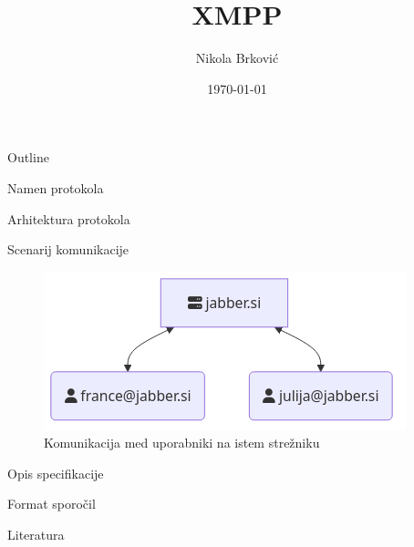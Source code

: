 \documentclass[presentation]{beamer}
\author{Nikola Brković}
\date{\today}
\title{XMPP}
\begin{document}
\maketitle
\begin{frame}{Outline}
\tableofcontents
\end{frame}


\begin{frame}[label={sec:org2ee4b01}]{Namen protokola}
\end{frame}

\begin{frame}[label={sec:orga36edd1}]{Arhitektura protokola}
\end{frame}

\begin{frame}[label={sec:org10b7786}]{Scenarij komunikacije}
\begin{figure}[H]
\centering
\includegraphics[width=.9\linewidth]{images/local-server.png}
\caption{Komunikacija med uporabniki na istem strežniku}
\end{figure}
\end{frame}

\begin{frame}[label={sec:orgbb2320b}]{Opis specifikacije}
\end{frame}

\begin{frame}[label={sec:orgbd7ec6e}]{Format sporočil}
\end{frame}

\begin{frame}[label={sec:org8b96f50}]{Literatura}
\end{frame}
\end{document}
